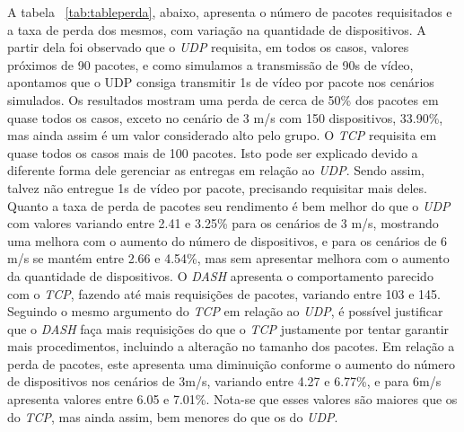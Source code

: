 \documentclass[12pt]{article}
\begin{document}
    A tabela ~\ref{tab:tableperda}, abaixo, apresenta o número de pacotes requisitados e a taxa de perda dos mesmos, com variação na quantidade de dispositivos. A partir dela foi observado que o \textit{UDP} requisita, em todos os casos, valores próximos de 90 pacotes, e como simulamos a transmissão de 90s de vídeo, apontamos que o UDP consiga transmitir 1s de vídeo por pacote nos cenários simulados. Os resultados mostram uma perda de cerca de 50\% dos pacotes em quase todos os casos, exceto no cenário de 3 m/s com 150 dispositivos, 33.90\%, mas ainda assim é um valor considerado alto pelo grupo. O \textit{TCP} requisita em quase todos os casos mais de 100 pacotes. Isto pode ser explicado devido a diferente forma dele gerenciar as entregas em relação ao \textit{UDP}. Sendo assim, talvez não entregue 1s de vídeo por pacote, precisando requisitar mais deles. Quanto a taxa de perda de pacotes seu rendimento é bem melhor do que o \textit{UDP} com valores variando entre 2.41 e 3.25\% para os cenários de 3 m/s, mostrando uma melhora com o aumento do número de dispositivos, e para os cenários de 6 m/s se mantém entre 2.66 e 4.54\%, mas sem apresentar melhora com o aumento da quantidade de dispositivos. O \textit{DASH} apresenta o comportamento parecido com o \textit{TCP}, fazendo até mais requisições de pacotes, variando entre 103 e 145. Seguindo o mesmo argumento do \textit{TCP} em relação ao \textit{UDP}, é possível justificar que o \textit{DASH} faça mais requisições do que o \textit{TCP} justamente por tentar garantir mais procedimentos, incluindo a alteração no tamanho dos pacotes. Em relação a perda de pacotes, este apresenta uma diminuição conforme o aumento do número de dispositivos nos cenários de 3m/s, variando entre 4.27 e 6.77\%, e para 6m/s apresenta valores entre 6.05 e 7.01\%. Nota-se que esses valores são maiores que os do \textit{TCP}, mas ainda assim, bem menores do que os do \textit{UDP}.
    
\end{document}
